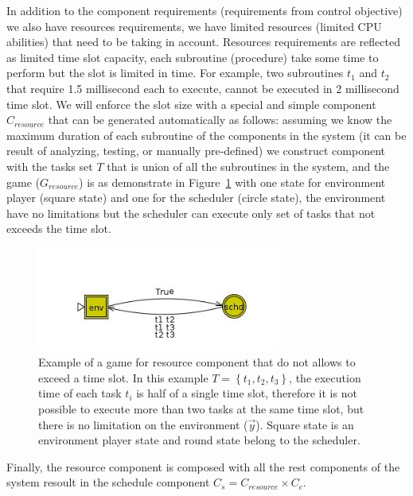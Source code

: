 \documentclass[ twoside, 12pt ]{article}
\begin{document}
In addition to the component requirements (requirements from control objective) we also have resources requirements, we have limited resources (limited CPU abilities) that need to be taking in account.
Resources requirements are reflected as limited time slot capacity, each subroutine (procedure) take some time to perform but the slot is limited in time.
For example, two subroutines $t_1$ and $t_2$ that require 1.5 millisecond each to execute, cannot be executed in 2 millisecond time slot.
We will enforce the slot size with a special and simple component $C_{resource}$ that can be generated automatically as follows:
assuming we know the maximum duration of each subroutine of the components in the system (it can be result of analyzing, testing, or manually pre-defined) we construct component with the tasks set $T$ that is union of all the subroutines in the system, and the game ($G_{resource}$) is as demonstrate in Figure~\ref{fig:C_resource} with one state for environment player (square state) and one for the scheduler (circle state), the environment have no limitations but the scheduler can execute only set of tasks that not exceeds the time slot.

\begin{figure} [h]
    \centerline{\includegraphics[width=80mm]{reasourceGame.jpg}}
    \caption{Example of a game for resource component that do not allows to exceed a time slot. 
        In this example $T = \left\{ t_1 , t_2 , t_3 \right\}$, the execution time of each task $t_i$ is half of a single time slot, therefore it is not possible to execute more than two tasks at the same time slot, but there is no limitation on the environment ($\vec{y}$).
        Square state is an environment player state and round state belong to the scheduler.  }
    \label{fig:C_resource}
\end{figure}

Finally, the resource component is composed with all the rest components of the system resoult in the schedule component $C_s = C_{resource} \times C_c$.
\end{document}
